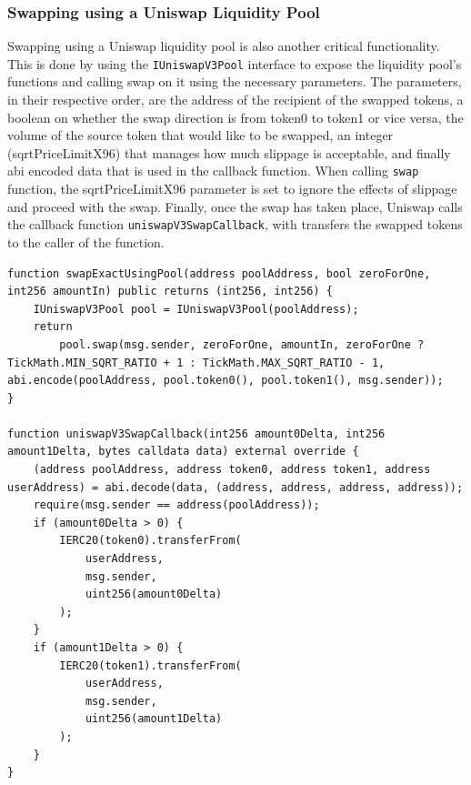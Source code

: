\subsubsection{Swapping using a Uniswap Liquidity Pool}
Swapping using a Uniswap liquidity pool is also another critical functionality. This is done by using the \texttt{IUniswapV3Pool} interface to expose the liquidity pool's functions and calling swap on it using the necessary parameters. The parameters, in their respective order, are the address of the recipient of the swapped tokens, a boolean on whether the swap direction is from token0 to token1 or vice versa, the volume of the source token that would like to be swapped, an integer (sqrtPriceLimitX96) that manages how much slippage is acceptable, and finally abi encoded data that is used in the callback function. When calling \texttt{swap} function, the sqrtPriceLimitX96 parameter is set to ignore the effects of slippage and proceed with the swap. Finally, once the swap has taken place, Uniswap calls the callback function \texttt{uniswapV3SwapCallback}, with transfers the swapped tokens to the caller of the function.

\begin{lstlisting}[language=Solidity]
function swapExactUsingPool(address poolAddress, bool zeroForOne, int256 amountIn) public returns (int256, int256) {
    IUniswapV3Pool pool = IUniswapV3Pool(poolAddress);
    return
        pool.swap(msg.sender, zeroForOne, amountIn, zeroForOne ? TickMath.MIN_SQRT_RATIO + 1 : TickMath.MAX_SQRT_RATIO - 1, abi.encode(poolAddress, pool.token0(), pool.token1(), msg.sender));
}

function uniswapV3SwapCallback(int256 amount0Delta, int256 amount1Delta, bytes calldata data) external override {
    (address poolAddress, address token0, address token1, address userAddress) = abi.decode(data, (address, address, address, address));
    require(msg.sender == address(poolAddress));
    if (amount0Delta > 0) {
        IERC20(token0).transferFrom(
            userAddress,
            msg.sender,
            uint256(amount0Delta)
        );
    }
    if (amount1Delta > 0) {
        IERC20(token1).transferFrom(
            userAddress,
            msg.sender,
            uint256(amount1Delta)
        );
    }
}
\end{lstlisting}

